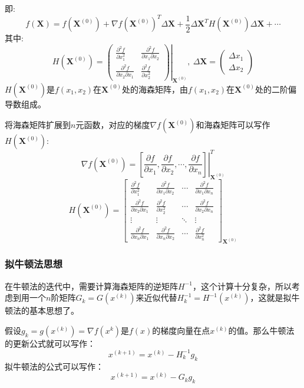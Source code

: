 \documentclass[11pt]{report}
\begin{document}
即:
\begin{equation}
	f(\textbf{X})=f(\textbf{X}^{(0)})+\nabla f(\textbf{X}^{(0)})^T\Delta \textbf{X}+\frac{1}{2}\Delta\textbf{X}^TH(\textbf{X}^{(0)})\Delta\textbf{X}+\cdots
\end{equation}
其中:
\begin{equation}
	H(\textbf{X}^{(0)})=
	\left.\left(
	\begin{matrix}
		\frac{\partial^2 f}{\partial x_1^2} & \frac{\partial^2 f}{\partial x_1\partial x_2}\\
		\frac{\partial^2 f}{\partial x_2\partial x_1} & \frac{\partial^2 f}{\partial x_2^2}
	\end{matrix}
	\right)\right|_{\textbf{X}^{(0)}},\ \Delta\textbf{X}=
	\left(\begin{matrix}
			\Delta x_1\\
			\Delta x_2
	\end{matrix} \right)
\end{equation}
$H(\textbf{X}^{(0)})$是$f(x_1,x_2)$在$\textbf{X}^{(0)}$处的海森矩阵，由$f(x_1,x_2)$在$\textbf{X}^{(0)}$处的二阶偏导数组成。
\par
将海森矩阵扩展到$n$元函数，对应的梯度$\nabla f(\textbf{X}^{(0)})$和海森矩阵可以写作$H(\textbf{X}^{(0)})$:
\begin{equation}
	\nabla f(\textbf{X}^{(0)})=\left.\left[\frac{\partial f}{\partial x_1},\frac{\partial f}{\partial x_2},\cdots,\frac{\partial f}{\partial x_n}\right]\right|^T_{\textbf{X}^{(0)}}
\end{equation}
\begin{equation}
	H(\textbf{X}^{(0)})=
	\left[
	\begin{matrix}
		\frac{\partial^2 f}{\partial x_1^2} & \frac{\partial^2 f}{\partial x_1\partial x_2} & \cdots & \frac{\partial^2 f}{\partial x_1\partial x_n}\\
		\frac{\partial^2 f}{\partial x_2 \partial x_1} & \frac{\partial^2 f}{\partial x_2^2} & \cdots & \frac{\partial^2 f}{\partial x_2\partial x_n}\\
		\vdots & \vdots & \ddots &\vdots\\
		\frac{\partial^2 f}{\partial x_n \partial x_1} & \frac{\partial^2 f}{\partial x_n \partial x_2} & \cdots & \frac{\partial^2 f}{\partial x_n^2}
	\end{matrix}
	\right]_{\textbf{X}^{(0)}}
\end{equation}
\subsubsection{拟牛顿法思想}
在牛顿法的迭代中，需要计算海森矩阵的逆矩阵$H^{-1}$，这个计算十分复杂，所以考虑到用一个$n$阶矩阵$G_k=G(x^{(k)})$来近似代替$H^{-1}_k=H^{-1}(x^{(k)})$，这就是拟牛顿法的基本思想了。
\par
假设$g_k=g(x^{(k)})=\nabla f(x^{k})$是$f(x)$的梯度向量在点$x^{(k)}$的值。那么牛顿法的更新公式就可以写作：
\begin{equation}
	x^{(k+1)}=x^{(k)}-H_k^{-1}g_k
\end{equation}
拟牛顿法的公式可以写作：
\begin{equation}
	x^{(k+1)}=x^{(k)}-G_kg_k
\end{equation}
\end{document}

